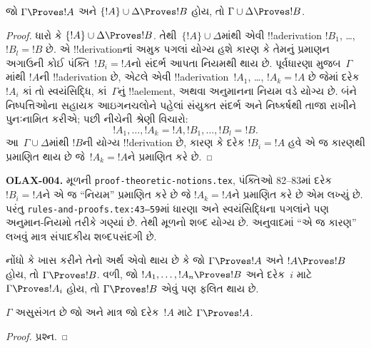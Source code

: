 \documentclass[../../../include/open-logic-section]{subfiles}
\begin{document}
\begin{prop}[પરંપરિતતા]
જો $\Gamma \Proves !A$ અને $\{!A\} \cup \Delta \Proves !B$ હોય, તો
$\Gamma \cup \Delta \Proves !B$.
\end{prop}

\begin{proof}
  ધારો કે $\{!A\} \cup \Delta \Proves !B$. તેથી~$\{!A\} \cup
  \Delta$માંથી એવી !!a{derivation} $!B_1$, \dots, $!B_l = !B$ છે.
  એ !!{derivation}નાં અમુક પગલાં યોગ્ય હશે કારણ કે તેમનું પ્રમાણન
  અગાઉની કોઈ પંક્તિ~$!B_i = !A$નો સંદર્ભ આપતા નિયમથી થાય છે. પૂર્વધારણા
  મુજબ~$\Gamma$માંથી $!A$ની !!a{derivation} છે, એટલે એવી
  !!a{derivation}~$!A_1$, \dots, $!A_k = !A$ છે જેમાં દરેક $!A_i$ કાં
  તો સ્વયંસિદ્ધિ, કાં~$\Gamma$નું !!a{element}, અથવા અનુમાનના નિયમ વડે
  યોગ્ય છે. બંને નિષ્પત્તિઓના સહાયક આઇગનચલોને પહેલાં સંયુક્ત સંદર્ભ અને
  નિષ્કર્ષથી તાજા રાખીને પુનઃનામિત કરીએ; પછી નીચેની શ્રેણી વિચારો:
  \[
  !A_1, \dots, !A_k = !A, !B_1, \dots, !B_l = !B.
  \]
  આ~$\Gamma \cup \Delta$માંથી $!B$ની યોગ્ય !!{derivation} છે, કારણ કે
  દરેક $!B_i = !A$ હવે એ જ કારણથી પ્રમાણિત થાય છે જે~$!A_k = !A$ને
  પ્રમાણિત કરે છે.
\end{proof}

\begin{editorial}
\textbf{OLAX-004.} મૂળની \texttt{proof-theoretic-notions.tex}, પંક્તિઓ 82--83માં દરેક $!B_i=!A$ને એ જ ``નિયમ'' પ્રમાણિત કરે છે જે $!A_k=!A$ને પ્રમાણિત કરે છે એમ લખ્યું છે. પરંતુ \texttt{rules-and-proofs.tex:43--59}માં ધારણા અને સ્વયંસિદ્ધિના પગલાંને પણ અનુમાન-નિયમો તરીકે ગણ્યાં છે. તેથી મૂળનો શબ્દ યોગ્ય છે. અનુવાદમાં ``એ જ કારણ'' લખવું માત્ર સંપાદકીય શબ્દપસંદગી છે.
\end{editorial}


નોંધો કે ખાસ કરીને તેનો અર્થ એવો થાય છે કે જો $\Gamma \Proves !A$ અને
$!A \Proves !B$ હોય, તો $\Gamma \Proves !B$. વળી, જો
$!A_1, \dots, !A_n \Proves !B$ અને દરેક~$i$ માટે
$\Gamma \Proves !A_i$ હોય, તો $\Gamma \Proves !B$ એવું પણ ફલિત થાય છે.

\begin{prop}
$\Gamma$ અસુસંગત છે જો અને માત્ર જો દરેક~$!A$ માટે
$\Gamma \Proves !A$.
\end{prop}

\begin{proof}
પ્રશ્ન.
\end{proof}
\end{document}
